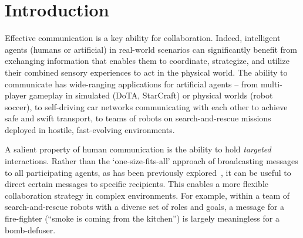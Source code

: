 \vspace{-20pt}
\section{Introduction}
\label{sec:intro}

Effective communication is a key ability for collaboration.
Indeed, intelligent agents (humans or artificial) in real-world scenarios can
significantly benefit from exchanging information that enables them to coordinate,
strategize, and utilize their combined sensory experiences to act in the physical world.
The ability to communicate has wide-ranging applications for artificial agents --
from multi-player gameplay in simulated (\eg DoTA, StarCraft) or
physical worlds (\eg robot soccer), to self-driving car networks communicating
with each other to achieve safe and swift transport, to teams of robots on
search-and-rescue missions deployed in hostile, fast-evolving environments.

A salient property of human communication is the ability to hold \emph{targeted} interactions.
Rather than the `one-size-fits-all' approach of broadcasting messages to all participating agents,
as has been previously explored~\citep{sukhbaatar_nips16,foerster_nips16,singh_iclr19},
it can be useful to direct certain messages to specific recipients.
This enables a more flexible collaboration strategy in complex environments.
For example, within a team of search-and-rescue robots with a diverse set of roles and goals,
a message for a fire-fighter (\eg ``smoke is coming from the kitchen'') is largely
meaningless for a bomb-defuser.


